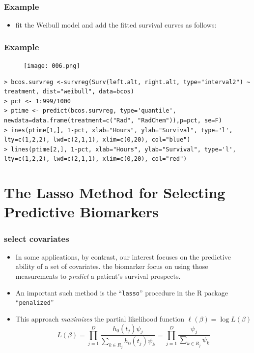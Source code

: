 \documentclass{beamer}
\newcommand{\empr}[1]{{\emph{\color{red}#1}}}
\begin{document}
\pagebreak
\begin{frame}[fragile]
\frametitle{Example}
\begin{itemize}
\begin{Verbatim}
> bcos <- within(bcos, \{
left.alt <- left
left.alt[left == 0] <- 0.1
right.alt <- right
right.alt[is.infinite(right)] <- 65\})
> bcos[c(1,33, 47, 62, 90),]
       left    right    treatment    right.alt    left.alt
1       45       Inf          Rad           65        45.0
33       0         5          Rad            5         0.1
47       8        12      RadChem           12         8.0
62      14        17      RadChem           17        14.0
90      16        60      RadChem           60        16.0
\end{Verbatim}
\item fit the Weibull model and add the fitted survival curves as follows:
\end{itemize}
\end{frame}

\pagebreak
\begin{frame}[fragile]
\frametitle{Example}
\begin{figure}[h!]
\texttt{[image: 006.png]}
\end{figure}
\begin{Verbatim}
> bcos.survreg <-survreg(Surv(left.alt, right.alt, type="interval2") ~ 
treatment, dist="weibull", data=bcos)
> pct <- 1:999/1000
> ptime <- predict(bcos.survreg, type='quantile',
newdata=data.frame(treatment=c("Rad", "RadChem")),p=pct, se=F)
> ines(ptime[1,], 1-pct, xlab="Hours", ylab="Survival", type='l',
lty=c(1,2,2), lwd=c(2,1,1), xlim=c(0,20), col="blue") 
> lines(ptime[2,], 1-pct, xlab="Hours", ylab="Survival", type='l',
lty=c(1,2,2), lwd=c(2,1,1), xlim=c(0,20), col="red")
\end{Verbatim}
\end{frame}


\section{The Lasso Method for Selecting Predictive Biomarkers}
\begin{frame}
\frametitle{select covariates}
\begin{itemize}
\item In some applications, by contrast, our interest focuses on the predictive ability of a set of covariates. the biomarker focus on using those measurements to \empr{predict} a patient's survival prospects.
\item An important such method is the ``\texttt{lasso}'' procedure  in the R package ``\texttt{penalized}'' 
\item This approach \empr{maximizes} the partial likelihood function $\ell(\beta) = \log L(\beta)$
\begin{equation}
L(\beta) = \prod\limits_{j=1}^{D} \frac{h_0(t_j)\psi_j}{\sum\limits_{k\in R_j}^{}h_0(t_j)\psi_k} = \prod\limits_{j=1}^{D}\frac{\psi_j}{\sum\limits_{k \in R_j}^{}\psi_k}
\end{equation}
\end{itemize}
\end{frame}
\end{document}
